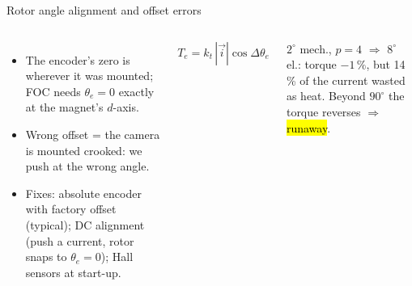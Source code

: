 \documentclass[aspectratio=169,10pt]{beamer}
\begin{document}
\begin{frame}[t]{Rotor angle alignment and offset errors}
\begin{columns}[T,onlytextwidth]
\begin{itemize}\small
\item The encoder's zero is wherever it was mounted; FOC needs $\theta_e=0$ exactly at the magnet's $d$-axis.
\item Wrong offset = the camera is mounted crooked: we push at the wrong angle.
\item Fixes: absolute encoder with factory offset (typical); DC alignment (push a current, rotor snaps to $\theta_e=0$); Hall sensors at start-up.
\end{itemize}
\begin{eqbox}\centering
$T_e=k_t\,|\vec i|\cos\Delta\theta_e$
\end{eqbox}
\begin{defbox}[Example]
\small $2^\circ$ mech., $p=4$ $\Rightarrow$ $8^\circ$ el.: torque $-1\,\%$, but 14\,\% of the current wasted as heat. Beyond $90^\circ$ the torque reverses $\Rightarrow$ \hl{runaway}.
\end{defbox}
\end{columns}
\end{frame}
\end{document}

